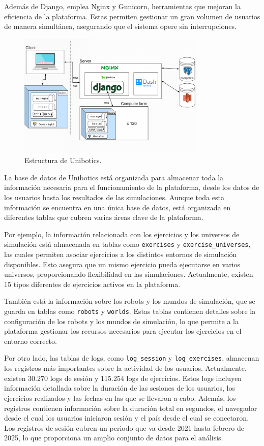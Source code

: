 \documentclass[a4paper, 12pt]{book}
\begin{document}
Además de Django, emplea Nginx y Gunicorn, herramientas que mejoran la eficiencia de la plataforma. Estas permiten gestionar un gran volumen de usuarios de manera simultánea, asegurando que el sistema opere sin interrupciones.

\begin{figure}
  \centering
  \includegraphics[width=0.8\textwidth, keepaspectratio]{img/arquitectura.png}
  \caption{Estructura de Unibotics.}
  \label{fig:arquitectura}
\end{figure}

La base de datos de Unibotics está organizada para almacenar toda la información necesaria para el funcionamiento de la plataforma, desde los datos de los usuarios hasta los resultados de las simulaciones. Aunque toda esta información se encuentra en una única base de datos, está organizada en diferentes tablas que cubren varias áreas clave de la plataforma.

Por ejemplo, la información relacionada con los ejercicios y los universos de simulación está almacenada en tablas como \texttt{exercises} y \texttt{exercise\_universes}, las cuales permiten asociar ejercicios a los distintos entornos de simulación disponibles. Esto asegura que un mismo ejercicio pueda ejecutarse en varios universos, proporcionando flexibilidad en las simulaciones. Actualmente, existen 15 tipos diferentes de ejercicios activos en la plataforma.

También está la información sobre los robots y los mundos de simulación, que se guarda en tablas como \texttt{robots} y \texttt{worlds}. Estas tablas contienen detalles sobre la configuración de los robots y los mundos de simulación, lo que permite a la plataforma gestionar los recursos necesarios para ejecutar los ejercicios en el entorno correcto.

Por otro lado, las tablas de logs, como \texttt{log\_session} y \texttt{log\_exercises}, almacenan los registros más importantes sobre la actividad de los usuarios. Actualmente, existen 30.270 logs de sesión y 115.254 logs de ejercicios. Estos logs incluyen información detallada sobre la duración de las sesiones de los usuarios, los ejercicios realizados y las fechas en las que se llevaron a cabo. Además, los registros contienen información sobre la duración total en segundos, el navegador desde el cual los usuarios iniciaron sesión y el país desde el cual se conectaron. Los registros de sesión cubren un periodo que va desde 2021 hasta febrero de 2025, lo que proporciona un amplio conjunto de datos para el análisis.
\end{document}
